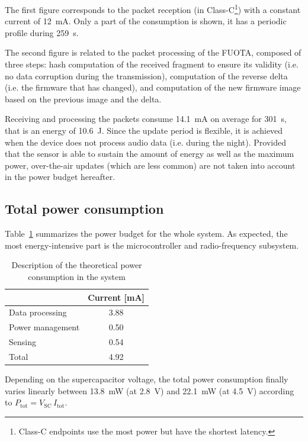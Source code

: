\documentclass{EPL-master-thesis-covers-EN}
\newcommand{\te}[1]{\textrm{#1}}
\begin{document}
The first figure corresponds to the packet reception (in Class-C\footnote{Class-C endpoints use the most power but have the shortest latency.}) with a constant current of \SI{12}{mA}. Only a part of the consumption is shown, it has a periodic profile during \SI{259}{s}.

The second figure is related to the packet processing of the FUOTA, composed of three steps: hash computation of the received fragment to ensure its validity (i.e. no data corruption during the transmission), computation of the reverse delta (i.e. the firmware that has changed), and computation of the new firmware image based on the previous image and the delta.

Receiving and processing the packets consume \SI{14.1}{mA} on average for \SI{301}{s}, that is an energy of \SI{10.6}{J}. Since the update period is flexible, it is achieved when the device does not process audio data (i.e. during the night). Provided that the sensor is able to sustain the amount of energy as well as the maximum power, over-the-air updates (which are less common) are not taken into account in the power budget hereafter.


\subsection*{Total power consumption}

Table~\ref{tab:power_consumption_theor} summarizes the power budget for the whole system. As expected, the most energy-intensive part is the microcontroller and radio-frequency subsystem.


\begin{table}[H]
\centering
\begin{tabular}{lc}
\toprule
                     & Current [\si{mA}] \\ \midrule
 Data processing     & 3.88              \\
 Power management    & 0.50              \\
 Sensing             & 0.54              \\ \midrule
 Total               & 4.92              \\ \bottomrule
\end{tabular}
\caption{Description of the theoretical power consumption in the system}
\label{tab:power_consumption_theor}
\end{table}

Depending on the supercapacitor voltage, the total power consumption finally varies linearly between \SI{13.8}{mW} (at \SI{2.8}{V}) and \SI{22.1}{mW} (at \SI{4.5}{V}) according to $P_\te{tot} = V_\te{SC} \, I_\te{tot}$.
\end{document}
